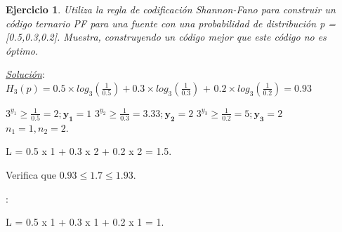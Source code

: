 \documentclass{beamer}
\newtheorem{ejercicio} [Corolario]{Ejercicio}
\begin{document}
\begin{frame}  \small

\begin{ejercicio}

Utiliza la regla de codificación Shannon-Fano para construir un código ternario PF para una fuente con una probabilidad de distribución 
p = [0.5,0.3,0.2]. Muestra, construyendo un código mejor que este código no es óptimo.
\end{ejercicio}
\pause

\textit{\underline{Solución}}:\\

$H_3(p)	=  0.5 \times log_3(\frac{1}{0.5})+ 0.3 \times log_3(\frac{1}{0.3})$ + $0.2 \times log_3(\frac{1}{0.2})  =0.93$\\

\begin{center}
$3^{y_{1}} \geq \frac{1}{0.5} = 2; \mathbf {y_{1}} =1$  $3^{y_{2}} \geq \frac{1}{0.3} = 3.33; \mathbf{y_{2}} =2$ $3^{y_{3}} \geq \frac{1}{0.2} = 5;\mathbf { y_{3} }=2$  \\
\vspace{0.25cm}
$n_1 = 1,n_2 = 2$. \\
\end{center}

\begin{center}
L = 0.5 x 1 + 0.3 x 2 + 0.2 x 2 = 1.5.
\end{center}

Verifica que $0.93 \leq 1.7 \leq 1.93$.

\vspace{0.25cm}
\color{red}{Pero podríamos crear un código con 1 bit cada uno}:
\begin{center}
L = 0.5 x 1 + 0.3 x 1 + 0.2 x 1 = 1.
\end{center}

\end{frame} 

\end{document}
